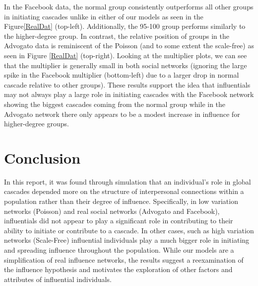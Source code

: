 \documentclass[10pt, oneside, reqno]{amsart}
\theoremstyle{plain}%
\theoremstyle{definition}
\theoremstyle{remark}
\begin{document}
In the Facebook data, the normal group consistently outperforms all other groups in initiating cascades unlike in either of our models as seen in the Figure\ref{RealDat} (top-left).
Additionally, the 95-100 group performs similarly to the higher-degree group.
In contrast, the relative position of groups in the Advogato data is reminiscent of the Poisson (and to some extent the scale-free) as seen in Figure \ref{RealDat} (top-right).
Looking at the multiplier plots, we can see that the multiplier is generally small in both social networks (ignoring the large spike in the Facebook multiplier (bottom-left) due to a larger drop in normal cascade relative to other groups).
These results support the idea that influentials may not always play a large role in initiating cascades with the Facebook network showing the biggest cascades coming from the normal group while in the Advogato network there only appears to be a modest increase in influence for higher-degree groups.





\section{Conclusion}

In this report, it was found through simulation that an individual's role in global cascades depended more on the structure of interpersonal connections within a population rather than their degree of influence.
Specifically, in low variation networks (Poisson) and real social networks (Advogato and Facebook), influentials did not appear to play a significant role in contributing to their ability to initiate or contribute to a cascade.
In other cases, such as high variation networks (Scale-Free) influential individuals play a much bigger role in initiating and spreading influence throughout the population. 
While our models are a simplification of real influence networks, the results suggest a reexamination of the influence hypothesis and motivates the exploration of other factors and attributes of influential individuals.


\end{document}
